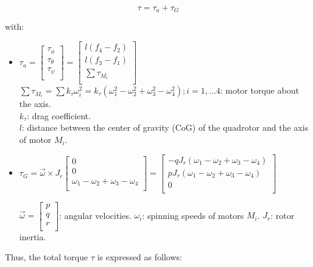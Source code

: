 \documentclass{thesisreport}
\begin{document}
\begin{equation}
	\tau = \tau_a + \tau_G
\end{equation}

with:

\begin{itemize}
	\item $\tau_a = \begin{bmatrix}
\tau_{\phi}\\
\tau_{\theta}\\
\tau_{\psi}\\
\end{bmatrix}= \begin{bmatrix}
l(f_4 - f_2)\\
l(f_3 - f_1)\\
\sum \tau_{M_i}\\
\end{bmatrix}$\\
$\sum \tau_{M_i} = \sum k_{\tau} \omega_i^2=k_{\tau}(\omega_1^2-\omega_2^2+\omega_3^2-\omega_4^2); i=1,\ldots 4$: motor torque about the axis.\\
$k_{\tau}$: drag coefficient.\\
$l$: distance between the center of gravity (CoG) of the quadrotor and the axis of motor $M_i$.

	\item $\tau_G=\overrightarrow{\omega}\times J_r \begin{bmatrix}
0 \\
0 \\
\omega_1 - \omega_2 + \omega_3 - \omega_4 \\
\end{bmatrix} = \begin{bmatrix}
-q J_r (\omega_1 - \omega_2 + \omega_3 - \omega_4)\\
p J_r (\omega_1 - \omega_2 + \omega_3 - \omega_4)\\
0 \\
\end{bmatrix}$

$\overrightarrow{\omega} = \begin{bmatrix}
p \\
q \\
r \\
\end{bmatrix}$: angular velocities.
$\omega_i$: spinning speeds of motors $M_i$.
$J_r$: rotor inertia.
\end{itemize}

Thus, the total torque $\tau$ is expressed as follows:
\end{document}
